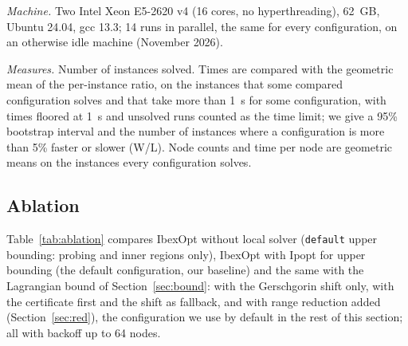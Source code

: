 \documentclass[11pt]{article}
\begin{document}
\emph{Machine.} Two Intel Xeon E5-2620 v4 (16 cores, no hyperthreading), 62~GB,
Ubuntu 24.04, gcc 13.3; 14 runs in parallel, the same for every configuration, on an
otherwise idle machine (November 2026).

\emph{Measures.} Number of instances solved. Times are compared with the geometric
mean of the per-instance ratio, on the instances that some compared configuration
solves and that take more than 1~s for some configuration, with times floored at 1~s and
unsolved runs counted as the time limit; we give a 95\% bootstrap interval and the
number of instances where a configuration is more than 5\% faster or slower (W/L). Node
counts and time per node are geometric means on the instances every configuration
solves.

\subsection{Ablation}

Table~\ref{tab:ablation} compares IbexOpt without local solver (\texttt{default}
upper bounding: probing and inner regions only), IbexOpt with Ipopt for upper
bounding (the default configuration, our baseline) and the same with the Lagrangian
bound of Section~\ref{sec:bound}: with the Gerschgorin shift only, with the
certificate first and the shift as fallback, and with range reduction added
(Section~\ref{sec:red}), the configuration we use by default in the rest of this
section; all with backoff up to 64 nodes.

\begin{table}[h]
\centering
{}
\caption{Ablation on the 298 instances (1200~s). Time ratios on the 109 instances that some
configuration solves and that take more than 1~s; nodes and time per node on the
instances solved by all.}
\label{tab:ablation}
\end{table}
\end{document}

